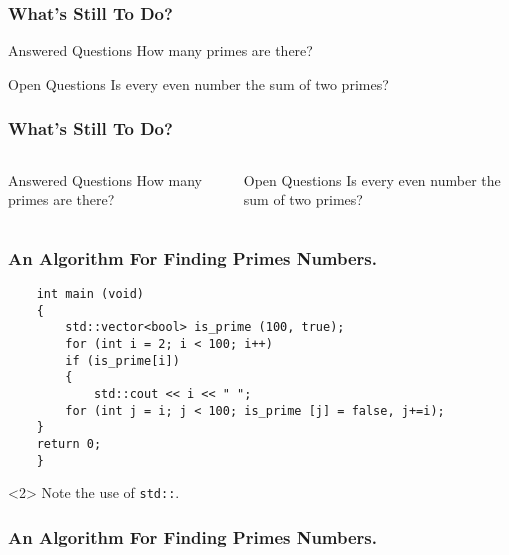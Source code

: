 \documentclass{beamer}
\begin{document}
\begin{frame}
	\frametitle{What's Still To Do?}
	\begin{block}{Answered Questions}
		How many primes are there?
	\end{block}
	\begin{block}{Open Questions}
		Is every even number the sum of two primes?
	\end{block}
\end{frame}

\begin{frame}
	\frametitle{What's Still To Do?}
	\begin{columns}[t]
		\begin{block}{Answered Questions}
			How many primes are there?
		\end{block}
		\pause
		\begin{block}{Open Questions}
			Is every even number the sum of two primes?
		\end{block}
	\end{columns}
\end{frame}


\begin{frame}[fragile]
	\frametitle{An Algorithm For Finding Primes Numbers.}
	\begin{verbatim}
    int main (void)
    {
        std::vector<bool> is_prime (100, true);
        for (int i = 2; i < 100; i++)
        if (is_prime[i])
        {
            std::cout << i << " ";
        for (int j = i; j < 100; is_prime [j] = false, j+=i);
    }
    return 0;
    }
    \end{verbatim}
	\begin{uncoverenv}
		Note the use of \verb|std::|.
	\end{uncoverenv}
\end{frame}

\begin{frame}[fragile]
	\frametitle{An Algorithm For Finding Primes Numbers.}
	\begin{semiverbatim}
	\end{semiverbatim}
\end{frame}
\end{document}
